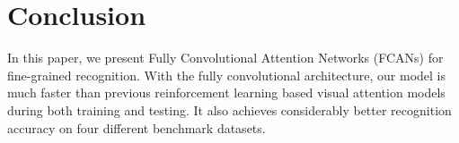 \documentclass[10pt,twocolumn,letterpaper]{article}
\begin{document}

\section{Conclusion}
In this paper, we present Fully Convolutional Attention Networks (FCANs) for fine-grained recognition.
With the fully convolutional architecture, our model is much faster than previous reinforcement learning based visual attention models during both training and testing.
It also achieves considerably better recognition accuracy on four different benchmark datasets.


\small


\end{document}
